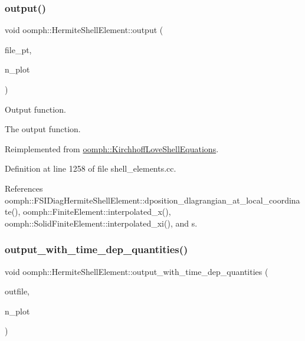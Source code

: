 \subsubsection{\texorpdfstring{output()}{output()}\hspace{0.1cm}{\footnotesize\ttfamily [4/4]}}
{\footnotesize\ttfamily void oomph\+::\+Hermite\+Shell\+Element\+::output (\begin{DoxyParamCaption}\item[{F\+I\+LE $\ast$}]{file\+\_\+pt,  }\item[{const unsigned \&}]{n\+\_\+plot }\end{DoxyParamCaption})\hspace{0.3cm}{\ttfamily [virtual]}}



Output function. 

The output function. 

Reimplemented from \hyperlink{classoomph_1_1KirchhoffLoveShellEquations_a27202721c38e55112bede54676946a27}{oomph\+::\+Kirchhoff\+Love\+Shell\+Equations}.



Definition at line 1258 of file shell\+\_\+elements.\+cc.



References oomph\+::\+F\+S\+I\+Diag\+Hermite\+Shell\+Element\+::dposition\+\_\+dlagrangian\+\_\+at\+\_\+local\+\_\+coordinate(), oomph\+::\+Finite\+Element\+::interpolated\+\_\+x(), oomph\+::\+Solid\+Finite\+Element\+::interpolated\+\_\+xi(), and s.

\mbox{\label{classoomph_1_1HermiteShellElement_a78713ac47c51ca8e8081ce7a5bfce592}} 
\subsubsection{\texorpdfstring{output\+\_\+with\+\_\+time\+\_\+dep\+\_\+quantities()}{output\_with\_time\_dep\_quantities()}}
{\footnotesize\ttfamily void oomph\+::\+Hermite\+Shell\+Element\+::output\+\_\+with\+\_\+time\+\_\+dep\+\_\+quantities (\begin{DoxyParamCaption}\item[{std\+::ostream \&}]{outfile,  }\item[{const unsigned \&}]{n\+\_\+plot }\end{DoxyParamCaption})}



